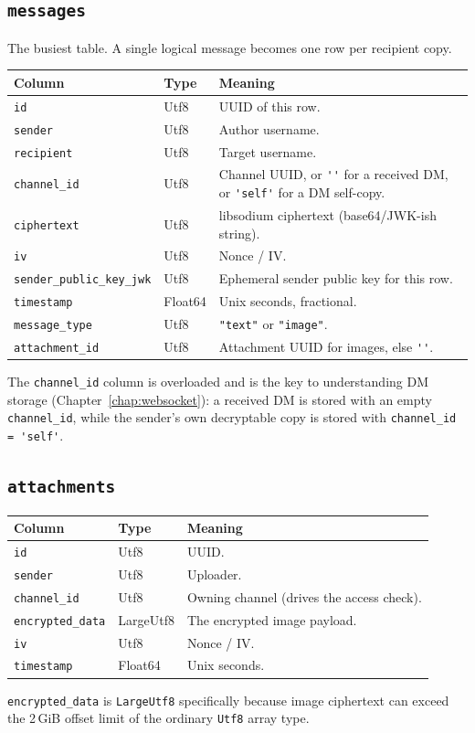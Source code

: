 \subsection*{\texttt{messages}}
The busiest table. A single logical message becomes one row per recipient copy.
\begin{center}
\begin{tabular}{@{}llp{}@{}}
\toprule
\textbf{Column} & \textbf{Type} & \textbf{Meaning} \\
\midrule
\verb|id| & Utf8 & UUID of this row. \\
\verb|sender| & Utf8 & Author username. \\
\verb|recipient| & Utf8 & Target username. \\
\verb|channel_id| & Utf8 & Channel UUID, or \verb|''| for a received DM, or \verb|'self'| for a DM self-copy. \\
\verb|ciphertext| & Utf8 & libsodium ciphertext (base64/JWK-ish string). \\
\verb|iv| & Utf8 & Nonce / IV. \\
\verb|sender_public_key_jwk| & Utf8 & Ephemeral sender public key for this row. \\
\verb|timestamp| & Float64 & Unix seconds, fractional. \\
\verb|message_type| & Utf8 & \verb|"text"| or \verb|"image"|. \\
\verb|attachment_id| & Utf8 & Attachment UUID for images, else \verb|''|. \\
\bottomrule
\end{tabular}
\end{center}

The \verb|channel_id| column is overloaded and is the key to understanding DM
storage (Chapter~\ref{chap:websocket}): a received DM is stored with an empty
\verb|channel_id|, while the sender's own decryptable copy is stored with
\verb|channel_id = 'self'|.

\subsection*{\texttt{attachments}}
\begin{center}
\begin{tabular}{@{}lll@{}}
\toprule
\textbf{Column} & \textbf{Type} & \textbf{Meaning} \\
\midrule
\verb|id| & Utf8 & UUID. \\
\verb|sender| & Utf8 & Uploader. \\
\verb|channel_id| & Utf8 & Owning channel (drives the access check). \\
\verb|encrypted_data| & LargeUtf8 & The encrypted image payload. \\
\verb|iv| & Utf8 & Nonce / IV. \\
\verb|timestamp| & Float64 & Unix seconds. \\
\bottomrule
\end{tabular}
\end{center}
\verb|encrypted_data| is \verb|LargeUtf8| specifically because image ciphertext
can exceed the 2\,GiB offset limit of the ordinary \verb|Utf8| array type.

